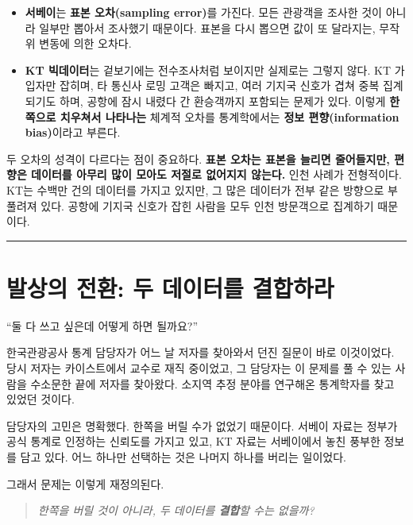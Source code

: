 \documentclass[
  letterpaper,
  DIV=11,
  numbers=noendperiod]{scrreprt}
\providecommand{\tightlist}{%
  \setlength{\itemsep}{0pt}\setlength{\parskip}{0pt}}
\begin{document}
\begin{itemize}
\tightlist
\item
  \textbf{서베이}는 \textbf{표본 오차(sampling error)}를 가진다. 모든
  관광객을 조사한 것이 아니라 일부만 뽑아서 조사했기 때문이다. 표본을
  다시 뽑으면 값이 또 달라지는, 무작위 변동에 의한 오차다.
\item
  \textbf{KT 빅데이터}는 겉보기에는 전수조사처럼 보이지만 실제로는
  그렇지 않다. KT 가입자만 잡히며, 타 통신사 로밍 고객은 빠지고, 여러
  기지국 신호가 겹쳐 중복 집계되기도 하며, 공항에 잠시 내렸다 간
  환승객까지 포함되는 문제가 있다. 이렇게 \textbf{한쪽으로 치우쳐서
  나타나는} 체계적 오차를 통계학에서는 \textbf{정보 편향(information
  bias)}이라고 부른다.
\end{itemize}

두 오차의 성격이 다르다는 점이 중요하다. \textbf{표본 오차는 표본을
늘리면 줄어들지만, 편향은 데이터를 아무리 많이 모아도 저절로 없어지지
않는다.} 인천 사례가 전형적이다. KT는 수백만 건의 데이터를 가지고
있지만, 그 많은 데이터가 전부 같은 방향으로 부풀려져 있다. 공항에 기지국
신호가 잡힌 사람을 모두 인천 방문객으로 집계하기 때문이다.

\begin{center}\rule{0.5\linewidth}{0.5pt}\end{center}

\section{발상의 전환: 두 데이터를
결합하라}\label{uxbc1cuxc0c1uxc758-uxc804uxd658-uxb450-uxb370uxc774uxd130uxb97c-uxacb0uxd569uxd558uxb77c}

``둘 다 쓰고 싶은데 어떻게 하면 될까요?''

한국관광공사 통계 담당자가 어느 날 저자를 찾아와서 던진 질문이 바로
이것이었다. 당시 저자는 카이스트에서 교수로 재직 중이었고, 그 담당자는
이 문제를 풀 수 있는 사람을 수소문한 끝에 저자를 찾아왔다. 소지역 추정
분야를 연구해온 통계학자를 찾고 있었던 것이다.

담당자의 고민은 명확했다. 한쪽을 버릴 수가 없었기 때문이다. 서베이
자료는 정부가 공식 통계로 인정하는 신뢰도를 가지고 있고, KT 자료는
서베이에서 놓친 풍부한 정보를 담고 있다. 어느 하나만 선택하는 것은
나머지 하나를 버리는 일이었다.

그래서 문제는 이렇게 재정의된다.

\begin{quote}
\emph{한쪽을 버릴 것이 아니라, 두 데이터를 \textbf{결합}할 수는 없을까?}
\end{quote}
\end{document}

